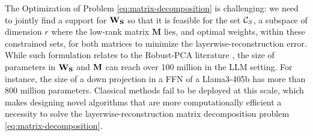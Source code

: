 
The Optimization of Problem \eqref{eq:matrix-decomposition} is challenging: we need to jointly find a support for $\mathbf{W_S}$ so that it is feasible for the set $\mathcal{C}_S$, a subspace of dimension $r$ where the low-rank matrix $\mathbf{M}$ lies, and optimal weights, within these constrained sets, for both matrices to minimize the layerwise-reconstruction error. While such formulation relates to the Robust-PCA literature \cite{chandrasekaran2011rank, candes2011robust, hintermuller2015robust}, the size of parameters in $\mathbf{W_S}$ and $\mathbf{M}$ can reach over 100 million in the LLM setting. For instance, the size of a down projection in a FFN of a Llama3-405b \cite{dubey2024llama} has more than 800 million parameters. 
Classical methods fail to be deployed at this scale, which makes designing novel algorithms that are more computationally efficient a necessity to solve the layerwise-reconstruction matrix decomposition problem \eqref{eq:matrix-decomposition}.


